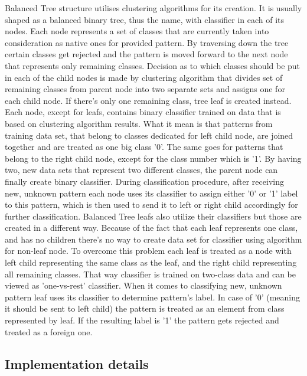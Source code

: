 Balanced Tree structure utilises clustering algorithms for its creation. It is usually shaped as a balanced binary tree, thus the name, with classifier in each of its nodes. Each node represents a set of classes that are currently taken into consideration as native ones for provided pattern. By traversing down the tree certain classes get rejected and the pattern is moved forward to the next node that represents only remaining classes. Decision as to which classes should be put in each of the child nodes is made by clustering algorithm that divides set of remaining classes from parent node into two separate sets and assigns one for each child node. If there's only one remaining class, tree leaf is created instead. Each node, except for leafs, contains binary classifier trained on data that is based on clustering algorithm results. What it mean is that patterns from training data set, that belong to classes dedicated for left child node, are joined together and are treated as one big class '0'. The same goes for patterns that belong to the right child node, except for the class number which is '1'. By having two, new data sets that represent two different classes, the parent node can finally create binary classifier. During classification procedure, after receiving new, unknown pattern each node uses its classifier to assign either '0' or '1' label to this pattern, which is then used to send it to left or right child accordingly for further classification. Balanced Tree leafs also utilize their classifiers but those are created in a different way. Because of the fact that each leaf represents one class, and has no children there's no way to create data set for classifier using algorithm for non-leaf node. To overcome this problem each leaf is treated as a node with left child representing the same class as the leaf, and the right child representing all remaining classes. That way classifier is trained on two-class data and can be viewed as 'one-vs-rest' classifier. When it comes to classifying new, unknown pattern leaf uses its classifier to determine pattern's label. In case of '0' (meaning it should be sent to left child) the pattern is treated as an element from class represented by leaf. If the resulting label is '1' the pattern gets rejected and treated as a foreign one.

\subsection{Implementation details}

